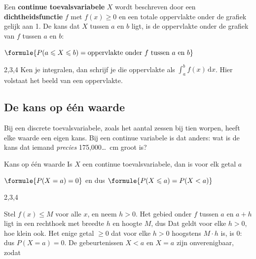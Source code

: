 \begin{theorie}
Een \textbf{\textcolor{accent}{continue toevalsvariabele}} $X$ wordt beschreven door een \textbf{\textcolor{accent}{dichtheidsfunctie}} $f$ met $f(x) \geqslant 0$ en een totale oppervlakte onder de grafiek gelijk aan 1. De kans dat $X$ tussen $a$ en $b$ ligt, is de oppervlakte onder de grafiek van $f$ tussen $a$ en $b$:

\vspace{1mm}
\qquad $\formule{P(a \leqslant X \leqslant b) = \text{oppervlakte onder } f \text{ tussen } a \text{ en } b}$
\end{theorie}

\begin{alleenvoor}{2,3,4}
Ken je integralen, dan schrijf je die oppervlakte als $\int_a^b f(x)\,\mathrm{d}x$. Hier volstaat het beeld van een oppervlakte.
\end{alleenvoor}

\subsection{De kans op één waarde}

Bij een discrete toevalsvariabele, zoals het aantal zessen bij tien worpen, heeft elke waarde een eigen kans. Bij een continue variabele is dat anders: wat is de kans dat iemand \textit{precies} 175,000\ldots\ cm groot is?

\begin{theorie}
\begin{stelling}{Kans op één waarde}
Is $X$ een continue toevalsvariabele, dan is voor elk getal $a$

\vspace{1mm}
\qquad $\formule{P(X = a) = 0}$ \qquad en dus \qquad $\formule{P(X \leqslant a) = P(X < a)}$
\end{stelling}
\begin{alleenvoor}{2,3,4}

\begin{bewijs}
Stel $f(x) \leqslant M$ voor alle $x$, en neem $h > 0$. Het gebied onder $f$ tussen $a$ en $a + h$ ligt in een rechthoek met breedte $h$ en hoogte $M$, dus
Dat geldt voor elke $h > 0$, hoe klein ook. Het enige getal $\geqslant 0$ dat voor elke $h > 0$ hoogstens $M \cdot h$ is, is 0: dus $P(X = a) = 0$. De gebeurtenissen $X < a$ en $X = a$ zijn onverenigbaar, zodat
\end{bewijs}
\end{alleenvoor}
\end{theorie}

